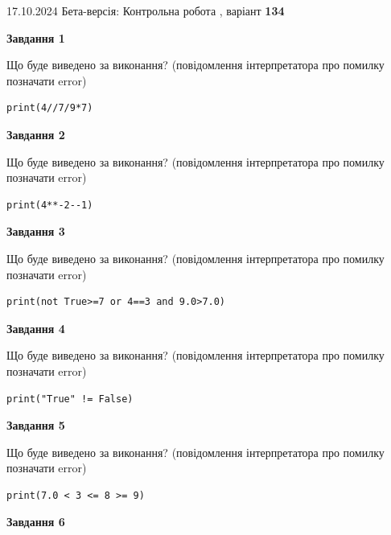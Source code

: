 \documentclass[12pt, ukrainian]{article}
\begin{document}
{\Large{17.10.2024 Бета-версія: Контрольна робота , варіант  \No \textbf { 134 }\par}}
{
\begin {large}
{\begin {center}\textbf{Завдання 1}\end {center}}

Що буде виведено за виконання? (повідомлення інтерпретатора про помилку позначати error)\par
\begin{verbatim}
print(4//7/9*7)
\end{verbatim}

{\begin {center}\textbf{Завдання 2}\end {center}}

Що буде виведено за виконання? (повідомлення інтерпретатора про помилку позначати error)\par
\begin{verbatim}
print(4**-2--1)
\end{verbatim}

{\begin {center}\textbf{Завдання 3}\end {center}}

Що буде виведено за виконання? (повідомлення інтерпретатора про помилку позначати error)\par
\begin{verbatim}
print(not True>=7 or 4==3 and 9.0>7.0)
\end{verbatim}

{\begin {center}\textbf{Завдання 4}\end {center}}

Що буде виведено за виконання? (повідомлення інтерпретатора про помилку позначати error)\par
\begin{verbatim}
print("True" != False)
\end{verbatim}

{\begin {center}\textbf{Завдання 5}\end {center}}

Що буде виведено за виконання? (повідомлення інтерпретатора про помилку позначати error)\par
\begin{verbatim}
print(7.0 < 3 <= 8 >= 9)
\end{verbatim}

{\begin {center}\textbf{Завдання 6}\end {center}}


\end{large}}
\end{document}

